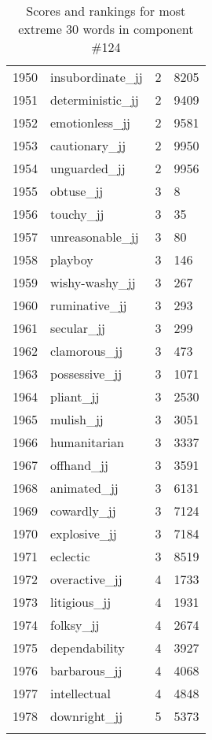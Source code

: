 \begin{longtable}[!htbp]{| rlr@{.}l |}
    1950 & insubordinate\_jj & 2 & 8205 \\
    1951 & deterministic\_jj & 2 & 9409 \\
    1952 & emotionless\_jj & 2 & 9581 \\
    1953 & cautionary\_jj & 2 & 9950 \\
    1954 & unguarded\_jj & 2 & 9956 \\
    1955 & obtuse\_jj & 3 & 8 \\
    1956 & touchy\_jj & 3 & 35 \\
    1957 & unreasonable\_jj & 3 & 80 \\
    1958 & playboy & 3 & 146 \\
    1959 & wishy-washy\_jj & 3 & 267 \\
    1960 & ruminative\_jj & 3 & 293 \\
    1961 & secular\_jj & 3 & 299 \\
    1962 & clamorous\_jj & 3 & 473 \\
    1963 & possessive\_jj & 3 & 1071 \\
    1964 & pliant\_jj & 3 & 2530 \\
    1965 & mulish\_jj & 3 & 3051 \\
    1966 & humanitarian & 3 & 3337 \\
    1967 & offhand\_jj & 3 & 3591 \\
    1968 & animated\_jj & 3 & 6131 \\
    1969 & cowardly\_jj & 3 & 7124 \\
    1970 & explosive\_jj & 3 & 7184 \\
    1971 & eclectic & 3 & 8519 \\
    1972 & overactive\_jj & 4 & 1733 \\
    1973 & litigious\_jj & 4 & 1931 \\
    1974 & folksy\_jj & 4 & 2674 \\
    1975 & dependability & 4 & 3927 \\
    1976 & barbarous\_jj & 4 & 4068 \\
    1977 & intellectual & 4 & 4848 \\
    1978 & downright\_jj & 5 & 5373 \\
    \hline
    \caption{Scores and rankings for most extreme 30 words in component \#124} \\
\end{longtable}
